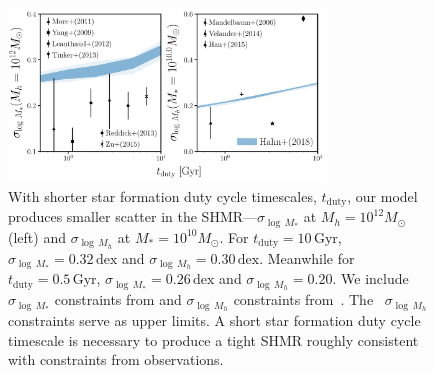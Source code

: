 \documentclass[12pt, letterpaper, preprint]{aastex}
\begin{document}

\begin{figure}
\begin{center}
\includegraphics[width=0.75\textwidth]{figs/SHMRscatter_tduty.pdf}
    \caption{With shorter star formation duty cycle timescales, $t_\mathrm{duty}$, our model
    produces smaller scatter in the SHMR---$\sigma_{\log\,M_*}$ at $M_h{=}10^{12} M_\odot$ (left) 
    and $\sigma_{\log\,M_h}$ at $M_*{=}10^{10} M_\odot$. For $t_\mathrm{duty} = 10\,\mathrm{Gyr}$, 
    $\sigma_{\log\,M_*} = 0.32\,\mathrm{dex}$ and $\sigma_{\log\,M_h} = 0.30\,\mathrm{dex}$. 
    Meanwhile for $t_\mathrm{duty} = 0.5\,\mathrm{Gyr}$, $\sigma_{\log\,M_*}= 0.26\,\mathrm{dex}$ 
    and $\sigma_{\log\,M_h} = 0.20$. We include $\sigma_{\log\,M_*}$ 
    constraints from \cite{yang2009, more2011, leauthaud2012, reddick2013, tinker2013, zu2015} 
    and $\sigma_{\log\,M_h}$ constraints from~\cite{mandelbaum2006, more2011, velander2014, han2015}.
    The~\cite{mandelbaum2006, han2015} $\sigma_{\log\,M_h}$ constraints serve as upper limits. 
    A short star formation duty cycle timescale is necessary to produce a tight SHMR roughly
    consistent with constraints from observations. 
    }
\label{fig:sigMstar_duty}
\end{center}
\end{figure}
\end{document}
